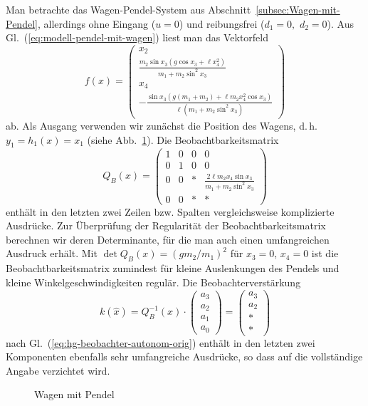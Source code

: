 \begin{example}
\label{exa:wagen-pendel-hg1}Man betrachte das Wagen-Pendel-System
aus Abschnitt~\ref{subsec:Wagen-mit-Pendel}, allerdings ohne Eingang
($u=0$) und reibungsfrei ($d_{1}=0,$ $d_{2}=0$). Aus Gl.~(\ref{eq:modell-pendel-mit-wagen})
liest man das Vektorfeld 
\begin{equation}
f(x)=\left(\begin{array}{c}
x_{2}\\
\frac{m_{2}\sin x_{3}\left(g\cos x_{3}+\ell x_{4}^{2}\right)}{m_{1}+m_{2}\sin^{2}x_{3}}\\
x_{4}\\
-\frac{\sin x_{3}\left(g(m_{1}+m_{2})+\ell m_{2}x_{4}^{2}\cos x_{3}\right)}{\ell\left(m_{1}+m_{2}\sin^{2}x_{3}\right)}
\end{array}\right)\label{eq:hg-wagen-pendel-f0}
\end{equation}
ab. Als Ausgang verwenden wir zunächst die Position des Wagens, d.\,h.
$y_{1}=h_{1}(x)=x_{1}$ (siehe Abb.~\ref{fig:Wagen-mit-Pendel-Hig-Gain}).
Die Beobachtbarkeitsmatrix 
\begin{equation}
Q_{B}(x)=\left(\begin{array}{cccc}
1 & 0 & 0 & 0\\
0 & 1 & 0 & 0\\
0 & 0 & * & \frac{2\ell m_{2}x_{4}\sin x_{3}}{m_{1}+m_{2}\sin^{2}x_{3}}\\
0 & 0 & * & *
\end{array}\right)\label{eq:wageh-pendel-hg-Qb1}
\end{equation}
enthält in den letzten zwei Zeilen bzw. Spalten vergleichsweise komplizierte
Ausdrücke. Zur Überprüfung der Regularität der Beobachtbarkeitsmatrix
berechnen wir deren Determinante, für die man auch einen umfangreichen
Ausdruck erhält. Mit $\det Q_{B}(x)=(gm_{2}/m_{1})^{2}$ für $x_{3}=0$,
$x_{4}=0$ ist die Beobachtbarkeitsmatrix zumindest für kleine Auslenkungen
des Pendels und kleine Winkelgeschwindigkeiten regulär. Die Beobachterverstärkung
\[
k(\hat{x})=Q_{B}^{-1}(x)\cdot\left(\begin{array}{c}
a_{3}\\
a_{2}\\
a_{1}\\
a_{0}
\end{array}\right)=\left(\begin{array}{c}
a_{3}\\
a_{2}\\
*\\
*
\end{array}\right)
\]
nach Gl.~(\ref{eq:hg-beobachter-autonom-orig}) enthält in den letzten
zwei Komponenten ebenfalls sehr umfangreiche Ausdrücke, so dass auf
die vollständige Angabe verzichtet wird.
\end{example}
\begin{figure}
\begin{centering}
\resizebox{0.5\textwidth}{!}{}
\par\end{centering}
\caption{Wagen mit Pendel\label{fig:Wagen-mit-Pendel-Hig-Gain}}
\end{figure}

